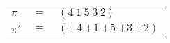 \begin{example}\label{example:GUELXUJE}
  \hfill \break
  \begin{tabular}{lll}
    $\pi$  & $=$ & $(4~1~5~3~2)$ \\
    $\pi'$ & $=$ & $({+4}~{+1}~{+5}~{+3}~{+2})$ \\
  \end{tabular}
\end{example}